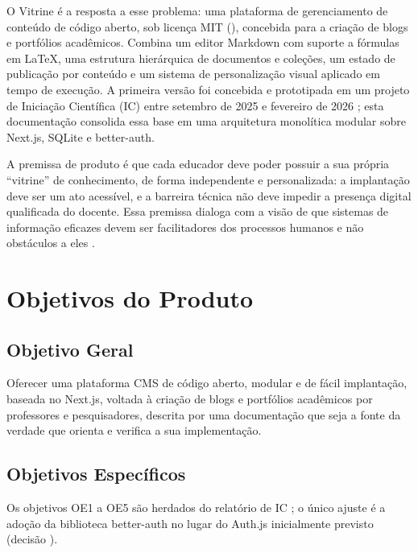 O Vitrine é a resposta a esse problema: uma plataforma de gerenciamento de conteúdo de código aberto, sob licença MIT (), concebida para a criação de blogs e portfólios acadêmicos. Combina um editor Markdown com suporte a fórmulas em \LaTeX{}, uma estrutura hierárquica de documentos e coleções, um estado de publicação por conteúdo e um sistema de personalização visual aplicado em tempo de execução. A primeira versão foi concebida e prototipada em um projeto de Iniciação Científica (IC) entre setembro de 2025 e fevereiro de 2026 \cite{reis2026ic}; esta documentação consolida essa base em uma arquitetura monolítica modular sobre Next.js, SQLite e better-auth.

A premissa de produto é que cada educador deve poder possuir a sua própria ``vitrine'' de conhecimento, de forma independente e personalizada: a implantação deve ser um ato acessível, e a barreira técnica não deve impedir a presença digital qualificada do docente. Essa premissa dialoga com a visão de que sistemas de informação eficazes devem ser facilitadores dos processos humanos e não obstáculos a eles \cite{rainer2019intro}.

\section{Objetivos do Produto}\label{sec:objetivos}

\subsection{Objetivo Geral}

Oferecer uma plataforma CMS de código aberto, modular e de fácil implantação, baseada no  Next.js, voltada à criação de blogs e portfólios acadêmicos por professores e pesquisadores, descrita por uma documentação que seja a fonte da verdade que orienta e verifica a sua implementação.

\subsection{Objetivos Específicos}\label{sec:objetivos-especificos}

Os objetivos OE1 a OE5 são herdados do relatório de IC \cite{reis2026ic}; o único ajuste é a adoção da biblioteca better-auth no lugar do Auth.js inicialmente previsto (decisão ).

